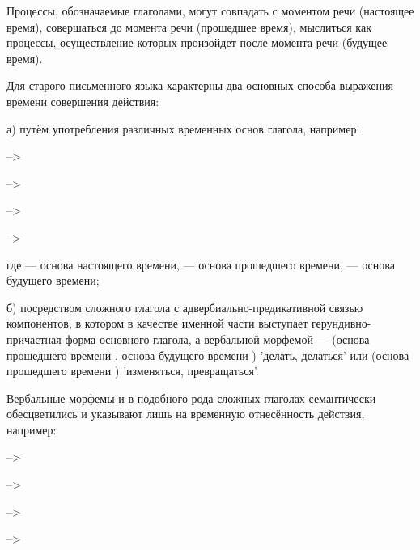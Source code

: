 Процессы, обозначаемые глаголами, могут совпадать с моментом речи (настоящее время), совершаться до момента речи (прошедшее время), мыслиться как процессы, осуществление которых произойдет после момента речи (будущее время).

Для старого письменного языка характерны два основных способа выражения времени совершения действия:

а) путём употребления различных временных основ глагола, например:

\begin{description}
\item{} -->
\item-->
\item-->
\item-->
\end{description}

где	 --- основа настоящего времени,  --- основа прошедшего времени,  --- основа будущего времени;

б) посредством сложного глагола с адвербиально-предикативной связью компонентов, в котором в качестве именной части выступает герундивно-причастная форма основного
глагола, а вербальной морфемой ---  (основа прошедшего времени , основа будущего времени ) 'делать, делаться' или	 (основа прошедшего времени ) 'изменяться, превращаться'.

Вербальные морфемы  и  в подобного рода сложных глаголах семантически обесцветились и указывают лишь на временную отнесённость действия, например:

\begin{description}
	\item{}-->
	\item-->
	\item-->
	\item-->
\end{description}

